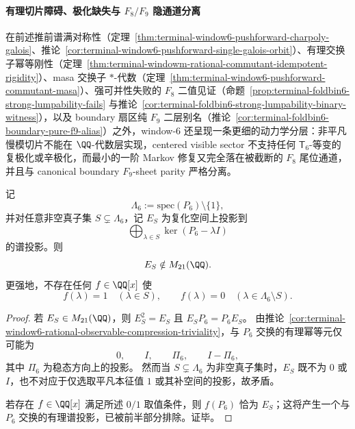 \paragraph{有理切片障碍、极化缺失与 \(F_8/F_9\) 隐通道分离}
在前述推前谱满对称性（定理~\ref{thm:terminal-window6-pushforward-charpoly-galois}、推论~\ref{cor:terminal-window6-pushforward-single-galois-orbit}）、有理交换子幂等刚性（定理~\ref{thm:terminal-windowm-rational-commutant-idempotent-rigidity}）、masa 交换子 \(*\)-代数（定理~\ref{thm:terminal-window6-pushforward-commutant-masa}）、强可并性失败的 \(F_8\) 二值见证（命题~\ref{prop:terminal-foldbin6-strong-lumpability-fails} 与推论~\ref{cor:terminal-foldbin6-strong-lumpability-binary-witness}），以及 boundary 扇区纯 \(F_9\) 二层别名（推论~\ref{cor:terminal-foldbin6-boundary-pure-f9-alias}）之外，window-\(6\) 还呈现一条更细的动力学分层：非平凡慢模切片不能在 \(\QQ\)-代数层实现，centered visible sector 不支持任何 \(\mathsf T_6\)-等变的复极化或辛极化，而最小的一阶 Markov 修复又完全落在被截断的 \(F_8\) 尾位通道，并且与 canonical boundary \(F_9\)-sheet parity 严格分离。

\begin{corollary}\label{cor:window6-no-rational-spectral-slice-projector}
记
\[
\Lambda_6:=\mathrm{spec}(P_6)\setminus\{1\},
\]
并对任意非空真子集 \(S\subsetneq \Lambda_6\)，记 \(E_S\) 为复化空间上投影到
\[
\bigoplus_{\lambda\in S}\ker(P_6-\lambda I)
\]
的谱投影。则
\[
E_S\notin M_{21}(\QQ).
\]
更强地，不存在任何 \(f\in\QQ[x]\) 使
\[
f(\lambda)=1\quad(\lambda\in S),\qquad
f(\lambda)=0\quad(\lambda\in \Lambda_6\setminus S).
\]
\end{corollary}

\begin{proof}
若 \(E_S\in M_{21}(\QQ)\)，则 \(E_S^2=E_S\) 且 \(E_S P_6=P_6 E_S\)。
由推论~\ref{cor:terminal-window6-rational-observable-compression-triviality}，与 \(P_6\) 交换的有理幂等元仅可能为
\[
0,\qquad I,\qquad \Pi_6,\qquad I-\Pi_6,
\]
其中 \(\Pi_6\) 为稳态方向上的投影。
然而当 \(S\subsetneq\Lambda_6\) 为非空真子集时，\(E_S\) 既不为 \(0\) 或 \(I\)，也不对应于仅选取平凡本征值 \(1\) 或其补空间的投影，故矛盾。

若存在 \(f\in\QQ[x]\) 满足所述 \(0/1\) 取值条件，则 \(f(P_6)\) 恰为 \(E_S\)；这将产生一个与 \(P_6\) 交换的有理谱投影，已被前半部分排除。证毕。
\end{proof}


